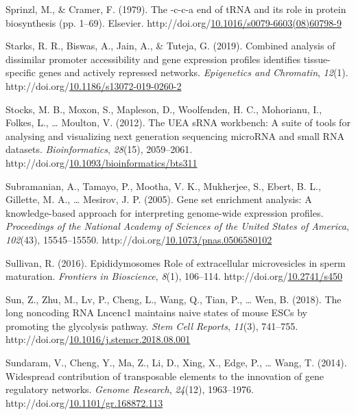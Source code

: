 \documentclass[12pt,twoside]{reedthesis}
\newlength{\cslhangindent}
\newenvironment{CSLReferences}[2] %
 {%
  \setlength{\parindent}{0pt}
  \ifodd #1 \everypar{\setlength{\hangindent}{\cslhangindent}}\ignorespaces\fi
  \ifnum #2 > 0
  \setlength{\parskip}{#2\baselineskip}
  \fi
 }%
 {}
\begin{document}
\begin{CSLReferences}{1}{0}
\leavevmode{}%
Sprinzl, M., \& Cramer, F. (1979). The -c-c-a end of tRNA and its role in protein biosynthesis (pp. 1--69). Elsevier. http://doi.org/\href{https://doi.org/10.1016/s0079-6603(08)60798-9}{10.1016/s0079-6603(08)60798-9}

\leavevmode{}%
Starks, R. R., Biswas, A., Jain, A., \& Tuteja, G. (2019). Combined analysis of dissimilar promoter accessibility and gene expression profiles identifies tissue-specific genes and actively repressed networks. \emph{Epigenetics and Chromatin}, \emph{12}(1). http://doi.org/\href{https://doi.org/10.1186/s13072-019-0260-2}{10.1186/s13072-019-0260-2}

\leavevmode{}%
Stocks, M. B., Moxon, S., Mapleson, D., Woolfenden, H. C., Mohorianu, I., Folkes, L., \ldots{} Moulton, V. (2012). The UEA sRNA workbench: A suite of tools for analysing and visualizing next generation sequencing microRNA and small RNA datasets. \emph{Bioinformatics}, \emph{28}(15), 2059--2061. http://doi.org/\href{https://doi.org/10.1093/bioinformatics/bts311}{10.1093/bioinformatics/bts311}

\leavevmode{}%
Subramanian, A., Tamayo, P., Mootha, V. K., Mukherjee, S., Ebert, B. L., Gillette, M. A., \ldots{} Mesirov, J. P. (2005). Gene set enrichment analysis: A knowledge-based approach for interpreting genome-wide expression profiles. \emph{Proceedings of the National Academy of Sciences of the United States of America}, \emph{102}(43), 15545--15550. http://doi.org/\href{https://doi.org/10.1073/pnas.0506580102}{10.1073/pnas.0506580102}

\leavevmode{}%
Sullivan, R. (2016). Epididymosomes Role of extracellular microvesicles in sperm maturation. \emph{Frontiers in Bioscience}, \emph{8}(1), 106--114. http://doi.org/\href{https://doi.org/10.2741/s450}{10.2741/s450}

\leavevmode{}%
Sun, Z., Zhu, M., Lv, P., Cheng, L., Wang, Q., Tian, P., \ldots{} Wen, B. (2018). The long noncoding RNA Lncenc1 maintains naive states of mouse ESCs by promoting the glycolysis pathway. \emph{Stem Cell Reports}, \emph{11}(3), 741--755. http://doi.org/\href{https://doi.org/10.1016/j.stemcr.2018.08.001}{10.1016/j.stemcr.2018.08.001}

\leavevmode{}%
Sundaram, V., Cheng, Y., Ma, Z., Li, D., Xing, X., Edge, P., \ldots{} Wang, T. (2014). Widespread contribution of transposable elements to the innovation of gene regulatory networks. \emph{Genome Research}, \emph{24}(12), 1963--1976. http://doi.org/\href{https://doi.org/10.1101/gr.168872.113}{10.1101/gr.168872.113}


\end{CSLReferences}
\end{document}
